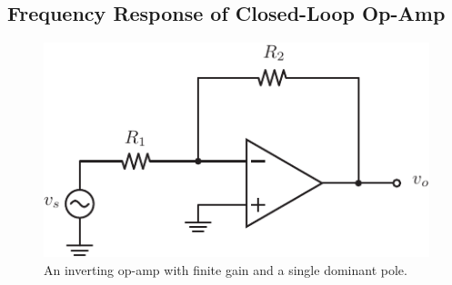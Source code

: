 \subsection{Frequency Response of Closed-Loop Op-Amp}
\begin{figure}[tb]
\begin{center}
\includegraphics[scale=1]{opamp_invert_gain}
\end{center}
\caption{An inverting op-amp with finite gain and a single dominant pole.}
\label{fig:opamp_invert_gain}
\end{figure}

